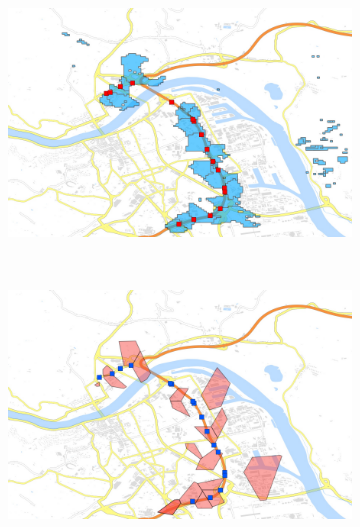 \begin{figure}
	\centering
	\begin{subfigure}[b]{0.5\linewidth}
		\includegraphics[width=\textwidth]{./images/1058_Coverage_Handover}
		\caption{}
		\label{fig:1058_coverage}
	\end{subfigure}%
	~
	\begin{subfigure}[b]{0.5\linewidth}
		\includegraphics[width=\textwidth]{./images/1058_Voronoi_Handover}
		\caption{}
		\label{fig:1058_voronoi}
	\end{subfigure}


\end{figure}
